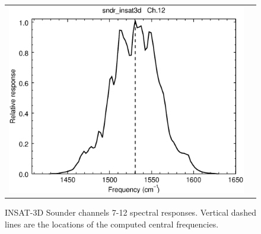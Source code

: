 \begin{figure}[H]
\begin{tabular}{c c}
    \includegraphics[scale=0.35]{graphics/sndr/srf/sndr_insat3d-12.eps}
  \end{tabular}
  \caption{INSAT-3D Sounder channels 7-12 spectral responses. Vertical dashed lines are the locations of the computed central frequencies.}
  \label{fig:sndr_ch7-12}
\end{figure}

